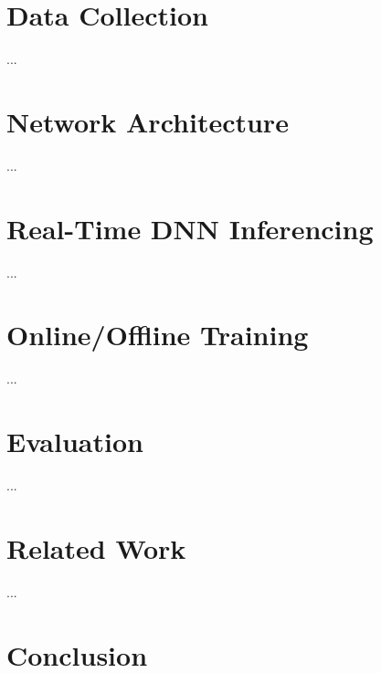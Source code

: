 \documentclass[10pt, conference]{IEEEtran}
\begin{document}
\section{Data Collection}
...
\section{Network Architecture}
...
\section{Real-Time DNN Inferencing}
...
\section{Online/Offline Training}
...
\section{Evaluation}
...
\section{Related Work}
...
\section{Conclusion}



\end{document}
